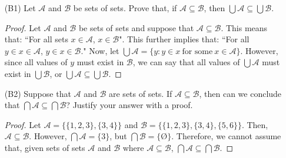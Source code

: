 \documentclass{article}
\begin{document}
    \begin{itemize}
    	\item [(B1)] Let $\mathcal{A}$ and $\mathcal{B}$ be sets of sets.  Prove that, if $\mathcal{A} \subseteq \mathcal{B}$, then $\bigcup \mathcal{A} \subseteq \bigcup \mathcal{B}$.
                \begin{proof}
                    Let $\mathcal{A}$ and $\mathcal{B}$ be sets of sets and suppose that $\mathcal{A} \subseteq \mathcal{B}$. This means that: ``For all sets $x \in \mathcal{A}$, $x \in \mathcal{B}$". This further implies that: ``For all $y \in x \in \mathcal{A}$, $y \in x \in \mathcal{B}$." Now, let $\bigcup \mathcal{A} = \{ y: y \in x \ \text{for some} \ x \in \mathcal{A} \}$. However, since all values of $y$ must exist in $\mathcal{B}$, we can say that all values of $\bigcup \mathcal{A}$ must exist in $\bigcup \mathcal{B}$, or $\bigcup \mathcal{A} \subseteq \bigcup \mathcal{B}$. 
                \end{proof}

    	\item [(B2)] Suppose that $\mathcal{A}$ and $\mathcal{B}$ are sets of sets.  If $\mathcal{A} \subseteq \mathcal{B}$, then can we conclude that $\bigcap \mathcal{A} \subseteq \bigcap \mathcal{B}$?
    		Justify your answer with a proof.
                \begin{proof}
                    Let $\mathcal{A} = \{ \{1, 2, 3 \}, \{ 3, 4 \} \}$ and $\mathcal{B} = \{ \{1, 2, 3 \}, \{ 3, 4 \}, \{ 5, 6 \}\}$. Then, $\mathcal{A} \subseteq \mathcal{B}$. However, $\bigcap \mathcal{A} = \{ 3 \}$, but $\bigcap \mathcal{B} = \{ \text{\O} \}$. Therefore, we cannot assume that, given sets of sets $\mathcal{A}$ and $\mathcal{B}$ where $\mathcal{A} \subseteq \mathcal{B}$, $\bigcap \mathcal{A} \subseteq \bigcap \mathcal{B}$.
                \end{proof}
    \end{itemize}
\end{document}
